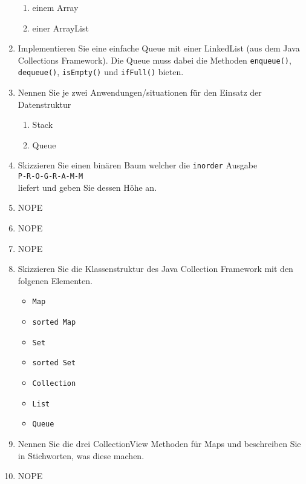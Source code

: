 \begin{enumerate}
        \begin{enumerate}[label=(\alph*)]
            \item einem Array
            \item einer ArrayList
        \end{enumerate}
	\item Implementieren Sie eine einfache Queue mit einer LinkedList 
        (aus dem Java Collections Framework). Die Queue muss dabei die
        Methoden \verb?enqueue()?, \verb?dequeue()?, \verb?isEmpty()? 
        und \verb?ifFull()? bieten.
	\item Nennen Sie je zwei Anwendungen/situationen für den Einsatz
        der Datenstruktur
        \begin{enumerate}[label=(\alph*)]
            \item Stack
            \item Queue
        \end{enumerate}
	\item Skizzieren Sie einen binären Baum welcher die \verb?inorder? 
        Ausgabe\\
        \verb?P-R-O-G-R-A-M-M?\\
        liefert und geben Sie dessen Höhe an.
    \item NOPE
	\item NOPE
	\item NOPE
	\item Skizzieren Sie die Klassenstruktur des Java Collection 
        Framework mit den folgenen Elementen.
        \begin{itemize}
            \item \verb?Map?
            \item \verb?sorted Map?
            \item \verb?Set?
            \item \verb?sorted Set?
            \item \verb?Collection?
            \item \verb?List?
            \item \verb?Queue?
        \end{itemize}
	\item Nennen Sie die drei CollectionView Methoden für Maps und
        beschreiben Sie in Stichworten, was diese machen.
	\item NOPE
\end{enumerate}
